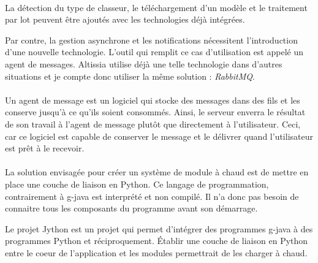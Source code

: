 \paragraph{}
La détection du type de classeur, le téléchargement d'un modèle et le traitement par lot peuvent être ajoutés avec les technologies déjà intégrées.

Par contre, la gestion asynchrone et les notifications nécessitent l'introduction d'une nouvelle technologie.
L'outil qui remplit ce cas d'utilisation est appelé un agent de messages.
Altissia utilise déjà une telle technologie dans d'autres situations et je compte donc utiliser la même solution : \textit{RabbitMQ}.

\paragraph{}
Un agent de message est un logiciel qui stocke des messages dans des fils et les conserve jusqu'à ce qu'ils soient consommés.
Ainsi, le serveur enverra le résultat de son travail à l'agent de message plutôt que directement à l'utilisateur.
Ceci, car ce logiciel est capable de conserver le message et le délivrer quand l'utilisateur est prêt à le recevoir.

\paragraph{}
La solution envisagée pour créer un système de module à chaud est de mettre en place une couche de liaison en Python.
Ce langage de programmation, contrairement à \Gls{g-java} est interprété et non compilé.
Il n'a donc pas besoin de connaitre tous les composants du programme avant son démarrage.

Le projet Jython est un projet qui permet d'intégrer des programmes \Gls{g-java} à des programmes Python et réciproquement.
Établir une couche de liaison en Python entre le coeur de l'application et les modules permettrait de les charger à chaud\cite{lutz_learning_2003}.

